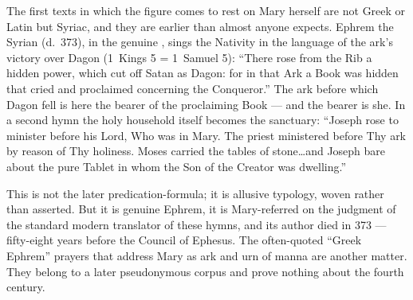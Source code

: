 The first texts in which the figure comes to rest on Mary herself are
not Greek or Latin but Syriac, and they are earlier than almost anyone
expects. Ephrem the Syrian (d.~373), in the genuine , sings the Nativity in the language of the ark's victory
over Dagon (1~Kings 5 = 1~Samuel 5): ``There rose from the Rib a hidden power,
which cut off Satan as Dagon: for in that Ark a Book was hidden that
cried and proclaimed concerning the Conqueror.'' The ark before which
Dagon fell is here the bearer of the proclaiming Book --- and the
bearer is she. In a second hymn the holy household itself becomes the
sanctuary: ``Joseph rose to minister before his Lord, Who was in
Mary. The priest ministered before Thy ark by reason of Thy holiness.
Moses carried the tables of stone\ldots and Joseph bare about the pure
Tablet in whom the Son of the Creator was dwelling.''

This is not the later predication-formula; it is allusive typology,
woven rather than asserted. But it is genuine Ephrem, it is
Mary-referred on the judgment of the standard modern translator of
these hymns, and its author died in 373 --- fifty-eight years before
the Council of Ephesus. The often-quoted ``Greek Ephrem'' prayers
that address Mary as ark and urn of manna are another matter. They
belong to a later pseudonymous corpus and prove nothing about the
fourth century.

